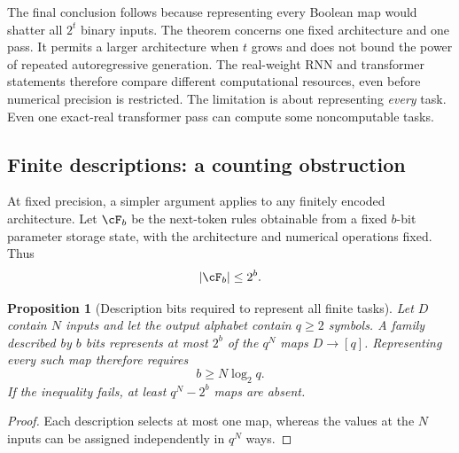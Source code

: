 \documentclass[11pt,twoside]{article}
\newtheorem{proposition}[theorem]{Proposition}
\theoremstyle{definition}
\theoremstyle{remark}
\begin{document}
The final conclusion follows because representing every Boolean map would
shatter all $2^t$ binary inputs. The theorem concerns one fixed architecture
and one pass. It permits a larger architecture when $t$ grows and does not
bound the power of repeated autoregressive generation. The real-weight
RNN and transformer statements therefore compare different computational
resources, even before numerical precision is restricted.
The limitation is about representing \emph{every} task. Even one exact-real
transformer pass can compute some noncomputable tasks.

\subsection{Finite descriptions: a counting obstruction}

At fixed precision, a simpler argument applies to any finitely encoded
architecture. Let $\cF_b$ be the next-token rules obtainable from a fixed
$b$-bit parameter storage state, with the architecture and numerical
operations fixed. Thus
\begin{equation}
 |\cF_b|\leq 2^b.
 \label{eq:description-count}
\end{equation}

\begin{proposition}[Description bits required to represent all finite tasks]
\label{prop:description-bits}
Let $D$ contain $N$ inputs and let the output alphabet contain $q\geq2$
symbols. A family described by $b$ bits represents at most $2^b$ of the
$q^N$ maps $D\to[q]$. Representing every such map therefore requires
\begin{equation}
 b\geq N\log_2 q.
 \label{eq:count-obstruction}
\end{equation}
If the inequality fails, at least $q^N-2^b$ maps are absent.
\end{proposition}
\begin{proof}
Each description selects at most one map, whereas the values at the $N$
inputs can be assigned independently in $q^N$ ways.
\end{proof}
\end{document}
